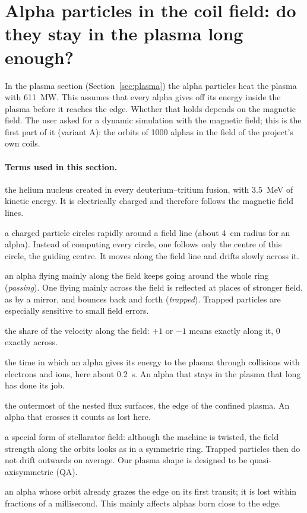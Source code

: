 \section{Alpha particles in the coil field: do they stay in the plasma long enough?}\label{sec:alpha}

In the plasma section (Section~\ref{sec:plasma}) the alpha particles heat the plasma with \SI{611}{MW}. This assumes
that every alpha gives off its energy inside the plasma before it reaches the edge. Whether that holds depends on the
magnetic field. The user asked for a dynamic simulation with the magnetic field; this is the first part of it
(variant A): the orbits of 1000 alphas in the field of the project's own coils.

\paragraph{Terms used in this section.}
\begin{description}\itemsep2pt
\item[alpha particle] the helium nucleus created in every deuterium--tritium fusion, with \SI{3.5}{MeV} of kinetic
  energy. It is electrically charged and therefore follows the magnetic field lines.
\item[guiding centre] a charged particle circles rapidly around a field line (about \SI{4}{cm} radius for an alpha).
  Instead of computing every circle, one follows only the centre of this circle, the guiding centre. It moves along
  the field line and drifts slowly across it.
\item[passing and trapped] an alpha flying mainly along the field keeps going around the whole ring
  (\emph{passing}). One flying mainly across the field is reflected at places of stronger field, as by a mirror, and
  bounces back and forth (\emph{trapped}). Trapped particles are especially sensitive to small field errors.
\item[$v_\parallel/v$] the share of the velocity along the field: $+1$ or $-1$ means exactly along it, $0$ exactly
  across.
\item[slowing-down time] the time in which an alpha gives its energy to the plasma through collisions with electrons
  and ions, here about \SI{0.2}{s}. An alpha that stays in the plasma that long has done its job.
\item[last closed surface] the outermost of the nested flux surfaces, the edge of the confined plasma. An alpha that
  crosses it counts as lost here.
\item[quasisymmetry] a special form of stellarator field: although the machine is twisted, the field strength along
  the orbits looks as in a symmetric ring. Trapped particles then do not drift outwards on average. Our plasma shape is
  designed to be quasi-axisymmetric (QA).
\item[prompt loss] an alpha whose orbit already grazes the edge on its first transit; it is lost within fractions of
  a millisecond. This mainly affects alphas born close to the edge.
\end{description}

